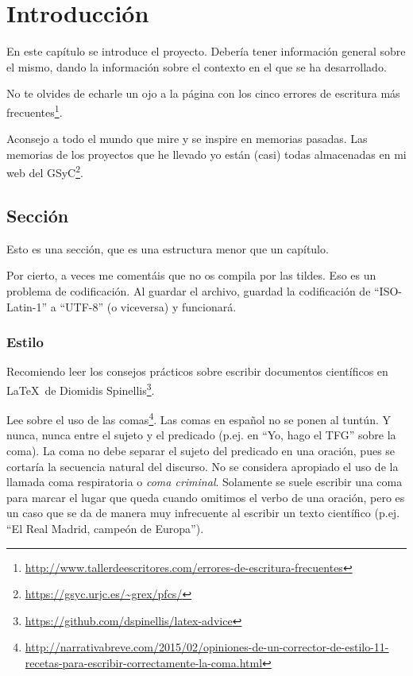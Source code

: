 \documentclass[a4paper, 12pt]{book}
\begin{document}

\cleardoublepage
\chapter{Introducción}
\label{sec:intro} %

En este capítulo se introduce el proyecto.
Debería tener información general sobre el mismo, dando la información sobre el contexto en el que se ha desarrollado.

No te olvides de echarle un ojo a la página con los cinco errores de escritura más frecuentes\footnote{\url{http://www.tallerdeescritores.com/errores-de-escritura-frecuentes}}.

Aconsejo a todo el mundo que mire y se inspire en memorias pasadas.
Las memorias de los proyectos que he llevado yo están (casi) todas almacenadas en mi web del GSyC\footnote{\url{https://gsyc.urjc.es/~grex/pfcs/}}.

\section{Sección}
\label{sec:seccion}

Esto es una sección, que es una estructura menor que un capítulo. 

Por cierto, a veces me comentáis que no os compila por las tildes.
Eso es un problema de codificación.
Al guardar el archivo, guardad la codificación de ``ISO-Latin-1'' a ``UTF-8'' (o viceversa) y funcionará.

\subsection{Estilo}
\label{subsec:estilo}

Recomiendo leer los consejos prácticos sobre escribir documentos científicos en \LaTeX \ de Diomidis Spinellis\footnote{\url{https://github.com/dspinellis/latex-advice}}.

Lee sobre el uso de las comas\footnote{\url{http://narrativabreve.com/2015/02/opiniones-de-un-corrector-de-estilo-11-recetas-para-escribir-correctamente-la-coma.html}}. 
Las comas en español no se ponen al tuntún.
Y nunca, nunca entre el sujeto y el predicado (p.ej. en ``Yo, hago el TFG'' sobre la coma).
La coma no debe separar el sujeto del predicado en una oración, pues se cortaría la secuencia natural del discurso.
No se considera apropiado el uso de la llamada coma respiratoria o \emph{coma criminal}.
Solamente se suele escribir una coma para marcar el lugar que queda cuando omitimos el verbo de una oración, pero es un caso que se da de manera muy infrecuente al escribir un texto científico (p.ej. ``El Real Madrid, campeón de Europa'').
\end{document}
